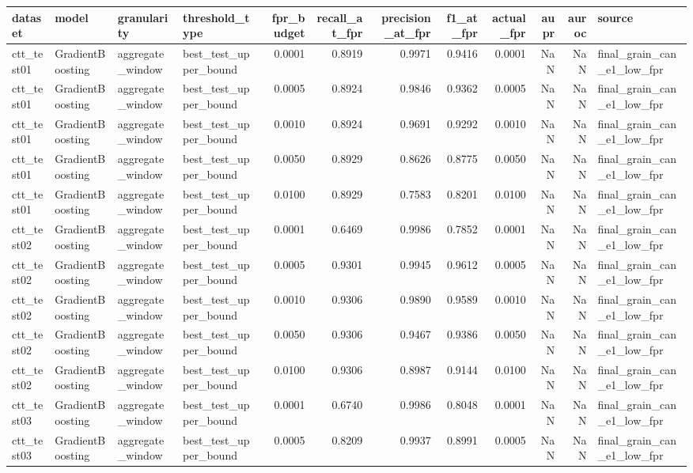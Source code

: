 \begin{tabular}{llllrrrrrrrl}
\toprule
dataset & model & granularity & threshold_type & fpr_budget & recall_at_fpr & precision_at_fpr & f1_at_fpr & actual_fpr & aupr & auroc & source \\
\midrule
ctt_test01 & GradientBoosting & aggregate_window & best_test_upper_bound & 0.0001 & 0.8919 & 0.9971 & 0.9416 & 0.0001 & NaN & NaN & final_grain_can_e1_low_fpr \\
ctt_test01 & GradientBoosting & aggregate_window & best_test_upper_bound & 0.0005 & 0.8924 & 0.9846 & 0.9362 & 0.0005 & NaN & NaN & final_grain_can_e1_low_fpr \\
ctt_test01 & GradientBoosting & aggregate_window & best_test_upper_bound & 0.0010 & 0.8924 & 0.9691 & 0.9292 & 0.0010 & NaN & NaN & final_grain_can_e1_low_fpr \\
ctt_test01 & GradientBoosting & aggregate_window & best_test_upper_bound & 0.0050 & 0.8929 & 0.8626 & 0.8775 & 0.0050 & NaN & NaN & final_grain_can_e1_low_fpr \\
ctt_test01 & GradientBoosting & aggregate_window & best_test_upper_bound & 0.0100 & 0.8929 & 0.7583 & 0.8201 & 0.0100 & NaN & NaN & final_grain_can_e1_low_fpr \\
ctt_test02 & GradientBoosting & aggregate_window & best_test_upper_bound & 0.0001 & 0.6469 & 0.9986 & 0.7852 & 0.0001 & NaN & NaN & final_grain_can_e1_low_fpr \\
ctt_test02 & GradientBoosting & aggregate_window & best_test_upper_bound & 0.0005 & 0.9301 & 0.9945 & 0.9612 & 0.0005 & NaN & NaN & final_grain_can_e1_low_fpr \\
ctt_test02 & GradientBoosting & aggregate_window & best_test_upper_bound & 0.0010 & 0.9306 & 0.9890 & 0.9589 & 0.0010 & NaN & NaN & final_grain_can_e1_low_fpr \\
ctt_test02 & GradientBoosting & aggregate_window & best_test_upper_bound & 0.0050 & 0.9306 & 0.9467 & 0.9386 & 0.0050 & NaN & NaN & final_grain_can_e1_low_fpr \\
ctt_test02 & GradientBoosting & aggregate_window & best_test_upper_bound & 0.0100 & 0.9306 & 0.8987 & 0.9144 & 0.0100 & NaN & NaN & final_grain_can_e1_low_fpr \\
ctt_test03 & GradientBoosting & aggregate_window & best_test_upper_bound & 0.0001 & 0.6740 & 0.9986 & 0.8048 & 0.0001 & NaN & NaN & final_grain_can_e1_low_fpr \\
ctt_test03 & GradientBoosting & aggregate_window & best_test_upper_bound & 0.0005 & 0.8209 & 0.9937 & 0.8991 & 0.0005 & NaN & NaN & final_grain_can_e1_low_fpr \\

\end{tabular}
